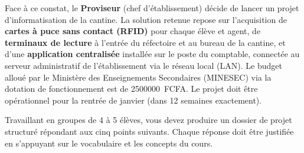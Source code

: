 \documentclass[11pt]{article}
\newcounter{popsec}
\newcounter{popsub}
\newcommand{\courssub}[1]{%
  \stepcounter{popsub}%
  \par\vspace{9pt}\noindent{\popxbold\fontsize{11.5}{13}\selectfont\color{popink}{\color{poporange}\thepopsec.\thepopsub}\hspace{6pt}#1}\par\nopagebreak\vspace{4pt}
}
\begin{document}
Face à ce constat, le \textbf{Proviseur} (chef d'établissement) décide de lancer un projet d'informatisation de la cantine. La solution retenue repose sur l'acquisition de \textbf{cartes à puce sans contact (RFID)} pour chaque élève et agent, de \textbf{terminaux de lecture} à l'entrée du réfectoire et au bureau de la cantine, et d'une \textbf{application centralisée} installée sur le poste du comptable, connectée au serveur administratif de l'établissement via le réseau local (LAN). Le budget alloué par le Ministère des Enseignements Secondaires (MINESEC) via la dotation de fonctionnement est de \SI{2500000}{FCFA}. Le projet doit être opérationnel pour la rentrée de janvier (dans 12 semaines exactement).

\courssub{Consignes}
Travaillant en groupes de 4 à 5 élèves, vous devez produire un dossier de projet structuré répondant aux cinq points suivants. Chaque réponse doit être justifiée en s'appuyant sur le vocabulaire et les concepts du cours.
\end{document}
